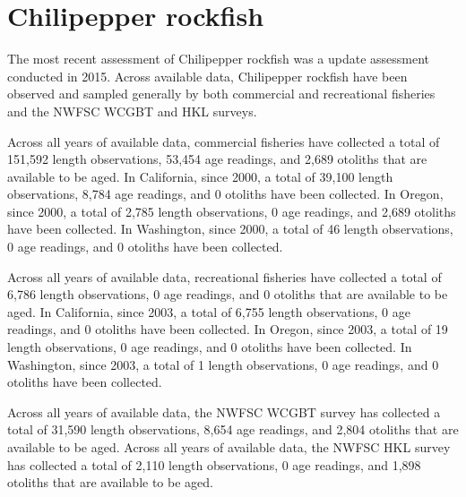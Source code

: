 \documentclass[11pt,
  english,
  letterpaper,
]{article}
\begin{document}

\hypertarget{chilipepper-rockfish}{%
\section{Chilipepper rockfish}\label{chilipepper-rockfish}}

\leavevmode\tagmcend\tagstructend


The most recent assessment of Chilipepper rockfish was a update assessment conducted in 2015. Across available data, Chilipepper rockfish have been observed and sampled generally by both commercial and recreational fisheries and the NWFSC WCGBT and HKL surveys.

\leavevmode\tagmcend\tagstructend\par


Across all years of available data, commercial fisheries have collected a total of 151,592 length observations, 53,454 age readings, and 2,689 otoliths that are available to be aged. In California, since 2000, a total of 39,100 length observations, 8,784 age readings, and 0 otoliths have been collected. In Oregon, since 2000, a total of 2,785 length observations, 0 age readings, and 2,689 otoliths have been collected. In Washington, since 2000, a total of 46 length observations, 0 age readings, and 0 otoliths have been collected.

\leavevmode\tagmcend\tagstructend\par


Across all years of available data, recreational fisheries have collected a total of 6,786 length observations, 0 age readings, and 0 otoliths that are available to be aged. In California, since 2003, a total of 6,755 length observations, 0 age readings, and 0 otoliths have been collected. In Oregon, since 2003, a total of 19 length observations, 0 age readings, and 0 otoliths have been collected. In Washington, since 2003, a total of 1 length observations, 0 age readings, and 0 otoliths have been collected.

\leavevmode\tagmcend\tagstructend\par


Across all years of available data, the NWFSC WCGBT survey has collected a total of 31,590 length observations, 8,654 age readings, and 2,804 otoliths that are available to be aged. Across all years of available data, the NWFSC HKL survey has collected a total of 2,110 length observations, 0 age readings, and 1,898 otoliths that are available to be aged.
\end{document}
